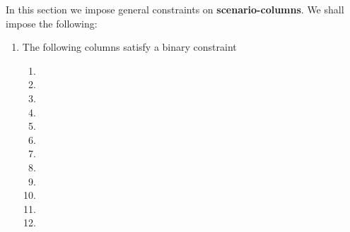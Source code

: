 \begin{center}
\end{center}
In this section we impose general constraints on \textbf{scenario-columns}. We shall impose the following:
\begin{enumerate}
	\item The following columns satisfy a binary constraint \lispDone{}
		\begin{enumerate}
			\item \scenCallException{}
			\item \scenCallAbortWillRevert{}
			\item \scenCallAbortWontRevert{}
			\item \scenCallEoaSuccessWontRevert{}
			\item \scenCallEoaSuccessWillRevert{}
			\item \scenCallSmcFailureWillRevert{}
			\item \scenCallSmcFailureWontRevert{}
			\item \scenCallSmcSuccessWillRevert{}
			\item \scenCallSmcSuccessWontRevert{}
			\item \scenCallPrcFailure{}
			\item \scenCallPrcSuccessWillRevert{}
			\item \scenCallPrcSuccessWontRevert{}
		\end{enumerate}
\end{enumerate}
